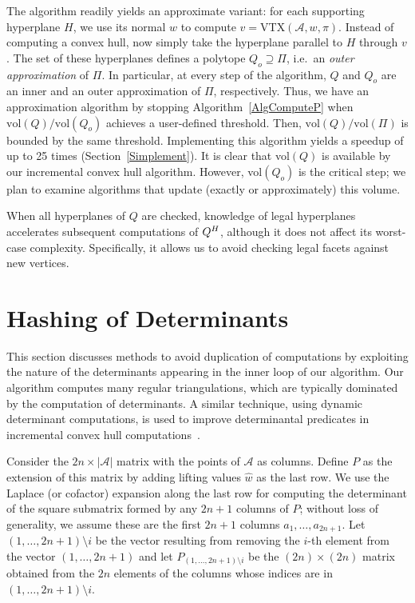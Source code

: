 \documentclass{article}
\def\A{{\mathcal A}} \def\R{{\mathcal R}}
\begin{document}
The algorithm readily yields an approximate variant:
for each supporting hyperplane $H$,
we use its normal $w$ to compute $v=${VTX}$(\A,w,\pi)$.
Instead of computing a convex hull, now simply
take the hyperplane parallel to $H$ through $v$. The set of
these hyperplanes defines a polytope $Q_{o}\supseteq \varPi$, i.e.\ an
\textit{outer approximation} of $\varPi$.
In particular, at every step of the algorithm, $Q$ and $Q_{o}$ are 
an inner and an outer approximation of $\varPi$, respectively.
Thus, we have an approximation algorithm by stopping Algorithm~\ref{AlgComputeP}
when $\text{vol}(Q)/\text{vol}(Q_{o})$ achieves a user-defined threshold.
Then, $\text{vol}(Q)/\text{vol}(\varPi)$ is bounded by the same threshold.
Implementing this algorithm yields a speedup of up to 25 times 
(Section~\ref{Simplement}).
It is clear that vol$(Q)$ is available by our incremental convex hull algorithm.
However, vol$(Q_o)$ is the critical step; we plan to examine algorithms
that update (exactly or approximately) this volume.  

When all hyperplanes of $Q$ are checked,
knowledge of legal hyperplanes accelerates subsequent computations of $Q^{H}$,
although it does not affect its worst-case complexity.
Specifically, it allows us to avoid checking legal facets against
new vertices.  
 
\section{Hashing of Determinants} \label{Shasheddets}

This section discusses methods to avoid duplication of computations by
exploiting the nature of the determinants appearing in the inner loop of
our algorithm.  
Our algorithm computes many regular triangulations,
which are typically dominated by the computation of determinants.
A similar technique, using dynamic determinant computations, is used to
improve determinantal predicates in incremental convex hull
computations~.

Consider the $2n\times|\A|$ matrix with the points of $\A$ as columns.
Define $P$ as the extension of this matrix by adding lifting values
$\widehat{w}$ as the last row.
We use the Laplace (or cofactor) expansion along the last row for computing
the determinant of the square submatrix formed by any $2n+1$ columns of
\(P\); without loss of generality, we assume these are the first $2n+1$
columns \(a_1,\ldots,a_{2n+1}\).
Let  $(1,\ldots,2n+1)\setminus i$ be the vector
resulting from removing the \(i\)-th element from the vector 
$(1,\ldots,2n+1)$ and let \(P_{(1,\ldots,2n+1) \setminus i}\)
be the \((2n) \times (2n)\) matrix obtained from the
\(2n\) elements of the columns whose indices are in 
$(1,\ldots,2n+1)\setminus i$.
\end{document}
